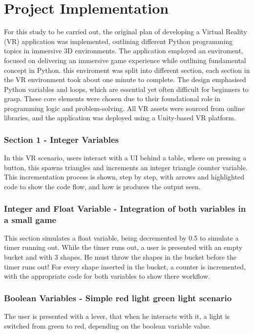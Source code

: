 \documentclass[conference]{IEEEtran}
\begin{document}
\section{Project Implementation}

For this study to be carried out, the original plan of developing a Virtual Reality (VR) application was implemented, outlining different Python programming topics in immersive 3D environments. The application employed an enviroment, focused on delivering an immersive game experience while outlining fundamental concept in Python. this enviroment was split into different section, each section in the VR environment took about one minute to complete. The design emphasised Python variables and loops, which are essential yet often difficult for beginners to grasp. These core elements were chosen due to their foundational role in programming logic and problem-solving. All VR assets were sourced from online libraries, and the application was deployed using a Unity-based VR platform.

\subsubsection{Section 1 - Integer Variables}
In this VR scenario, users interact with a UI behind a table, where on pressing a button, this spawns triangles and increments an integer triangle counter variable. This incrementation process is shown, step by step, with arrows and highlighted code to show the code flow, and how is produces the output seen.

\subsubsection{Integer and Float Variable - Integration of both variables in a small game}
This section simulates a float variable, being decremented by 0.5 to simulate a timer running out. While the timer runs out, a user is presented with an empty bucket and with 3 shapes. He must throw the shapes in the bucket before the timer runs out! For every shape inserted in the bucket, a counter is incremented, with the appropriate code for both variables to show there workflow.

\subsubsection{Boolean Variables - Simple red light green light scenario}
The user is presented with a lever, that when he interacts with it, a light is switched from green to red, depending on the boolean variable value. 
\end{document}
